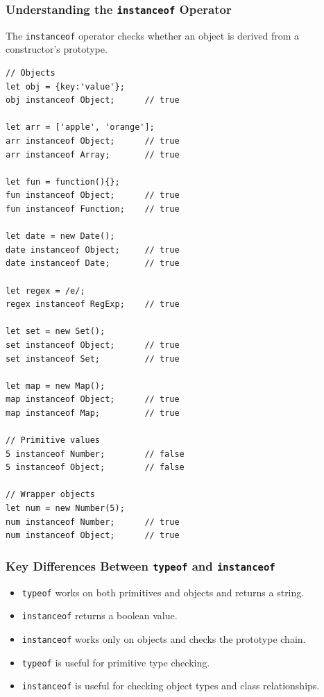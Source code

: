 \documentclass{scrbook}
\begin{document}
\subsubsection{Understanding the \texttt{instanceof} Operator}

The \texttt{instanceof} operator checks whether an object is derived from a constructor's prototype.

\begin{lstlisting}
// Objects
let obj = {key:'value'};
obj instanceof Object;      // true

let arr = ['apple', 'orange'];
arr instanceof Object;      // true
arr instanceof Array;       // true

let fun = function(){};
fun instanceof Object;      // true
fun instanceof Function;    // true

let date = new Date();
date instanceof Object;     // true
date instanceof Date;       // true

let regex = /e/;
regex instanceof RegExp;    // true

let set = new Set();
set instanceof Object;      // true
set instanceof Set;         // true

let map = new Map();
map instanceof Object;      // true
map instanceof Map;         // true

// Primitive values
5 instanceof Number;        // false
5 instanceof Object;        // false

// Wrapper objects
let num = new Number(5);
num instanceof Number;      // true
num instanceof Object;      // true
\end{lstlisting}

\subsubsection{Key Differences Between \texttt{typeof} and \texttt{instanceof}}

\begin{itemize}
    \item \texttt{typeof} works on both primitives and objects and returns a string.
    \item \texttt{instanceof} returns a boolean value.
    \item \texttt{instanceof} works only on objects and checks the prototype chain.
    \item \texttt{typeof} is useful for primitive type checking.
    \item \texttt{instanceof} is useful for checking object types and class relationships.
\end{itemize}
\end{document}
